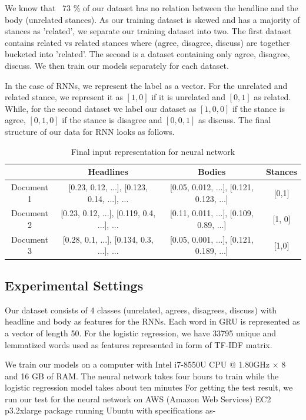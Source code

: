 \documentclass[11.5pt]{article}
\begin{document}
We know that ~73 \% of our dataset has no relation between the headline and the body (unrelated stances). As our training dataset is skewed and has a majority of stances as 'related', we separate our training dataset into two. The first dataset contains related vs related stances where (agree, disagree, discuss) are together bucketed into 'related'. The second is a dataset containing only agree, disagree, discuss. We then train our models separately for each dataset.

In the case of RNNs, we represent the label as a vector. For the unrelated and related stance, we represent it as $[1, 0]$ if it is unrelated and $[0, 1]$ as related.
While, for the second dataset we label our dataset as $[1, 0, 0]$ if the stance is agree, $[0, 1, 0]$ if the stance is disagree and $[0, 0, 1]$ as discuss. The final structure of our data for RNN looks as follows.

\begin{table}[h]
  \centering
  \begin{tabular} 
    {|c|c|c|c|}
    \hline
    & Headlines & Bodies & Stances \\
    \hline
    Document 1 & [0.23, 0.12, ...], [0.123, 0.14, ...], ... & [0.05, 0.012, ...], [0.121, 0.123, ...] & [0,1] \\
    \hline
    Document 2 & [0.23, 0.12, ...], [0.119, 0.4, ...], ... & [0.11, 0.011, ...], [0.109, 0.89, ...] & [1, 0] \\
    \hline
    Document 3 & [0.28, 0.1, ...], [0.134, 0.3, ...], ... & [0.05, 0.001, ...], [0.121, 0.189, ...] & [1,0] \\
    \hline
  \end{tabular}
  \caption{Final input representation for neural network}
\end{table}

\subsection{Experimental Settings}

Our dataset consists of 4 classes (unrelated, agrees, disagrees, discuss) with headline and body as features for the RNNs. Each word in GRU is represented as a vector of length 50.
For the logistic regression, we have 33795 unique and lemmatized words used as features represented in form of TF-IDF matrix.

We train our models on a computer with Intel i7-8550U CPU @ 1.80GHz × 8 and 16 GB of RAM. The neural network takes four hours to train while the logistic regression model takes about ten minutes
For getting the test result, we run our test for the neural network on AWS (Amazon Web Services) EC2 p3.2xlarge package running Ubuntu with specifications as-
\end{document}
